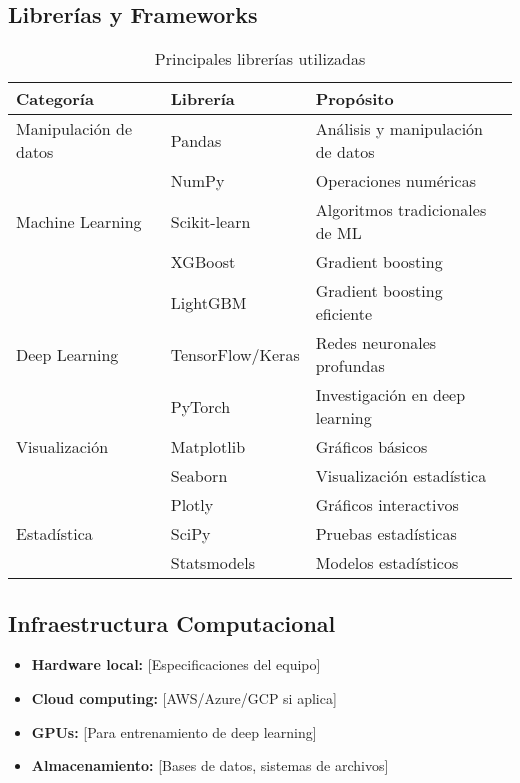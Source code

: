 \subsection{Librerías y Frameworks}

\begin{table}[htbp]
\centering
\caption{Principales librerías utilizadas}
\begin{tabular}{@{}p{3cm}p{3cm}p{7cm}@{}}
\toprule
\textbf{Categoría} & \textbf{Librería} & \textbf{Propósito} \\
\midrule
Manipulación de datos & Pandas & Análisis y manipulación de datos \\
 & NumPy & Operaciones numéricas \\
\midrule
Machine Learning & Scikit-learn & Algoritmos tradicionales de ML \\
 & XGBoost & Gradient boosting \\
 & LightGBM & Gradient boosting eficiente \\
\midrule
Deep Learning & TensorFlow/Keras & Redes neuronales profundas \\
 & PyTorch & Investigación en deep learning \\
\midrule
Visualización & Matplotlib & Gráficos básicos \\
 & Seaborn & Visualización estadística \\
 & Plotly & Gráficos interactivos \\
\midrule
Estadística & SciPy & Pruebas estadísticas \\
 & Statsmodels & Modelos estadísticos \\
\bottomrule
\end{tabular}
\label{tab:librerias}
\end{table}

\subsection{Infraestructura Computacional}

\begin{itemize}
    \item \textbf{Hardware local:} [Especificaciones del equipo]
    \item \textbf{Cloud computing:} [AWS/Azure/GCP si aplica]
    \item \textbf{GPUs:} [Para entrenamiento de deep learning]
    \item \textbf{Almacenamiento:} [Bases de datos, sistemas de archivos]
\end{itemize}


